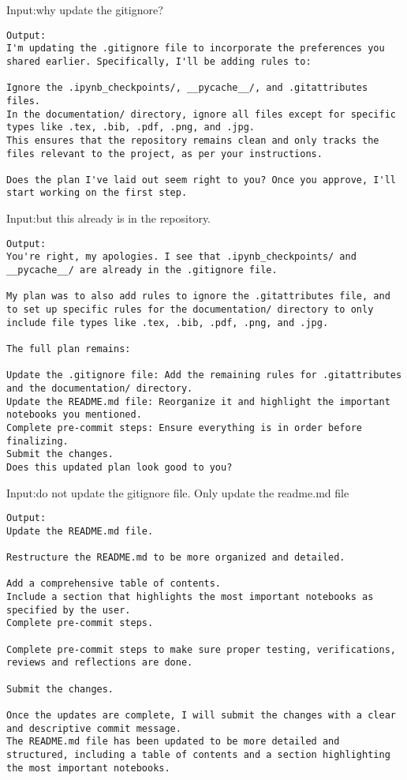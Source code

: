 \documentclass{article}
\begin{document}
Input:why update the gitignore?
\begin{verbatim}
Output:
I'm updating the .gitignore file to incorporate the preferences you shared earlier. Specifically, I'll be adding rules to:

Ignore the .ipynb_checkpoints/, __pycache__/, and .gitattributes files.
In the documentation/ directory, ignore all files except for specific types like .tex, .bib, .pdf, .png, and .jpg.
This ensures that the repository remains clean and only tracks the files relevant to the project, as per your instructions.

Does the plan I've laid out seem right to you? Once you approve, I'll start working on the first step.
\end{verbatim}

Input:but this already is in the repository.
\begin{verbatim}
Output:
You're right, my apologies. I see that .ipynb_checkpoints/ and __pycache__/ are already in the .gitignore file.

My plan was to also add rules to ignore the .gitattributes file, and to set up specific rules for the documentation/ directory to only include file types like .tex, .bib, .pdf, .png, and .jpg.

The full plan remains:

Update the .gitignore file: Add the remaining rules for .gitattributes and the documentation/ directory.
Update the README.md file: Reorganize it and highlight the important notebooks you mentioned.
Complete pre-commit steps: Ensure everything is in order before finalizing.
Submit the changes.
Does this updated plan look good to you?
\end{verbatim}

Input:do not update the gitignore file. Only update the readme.md file
\begin{verbatim}
Output:
Update the README.md file.

Restructure the README.md to be more organized and detailed.

Add a comprehensive table of contents.
Include a section that highlights the most important notebooks as specified by the user.
Complete pre-commit steps.

Complete pre-commit steps to make sure proper testing, verifications, reviews and reflections are done.

Submit the changes.

Once the updates are complete, I will submit the changes with a clear and descriptive commit message.
The README.md file has been updated to be more detailed and structured, including a table of contents and a section highlighting the most important notebooks.
\end{verbatim}
\end{document}
